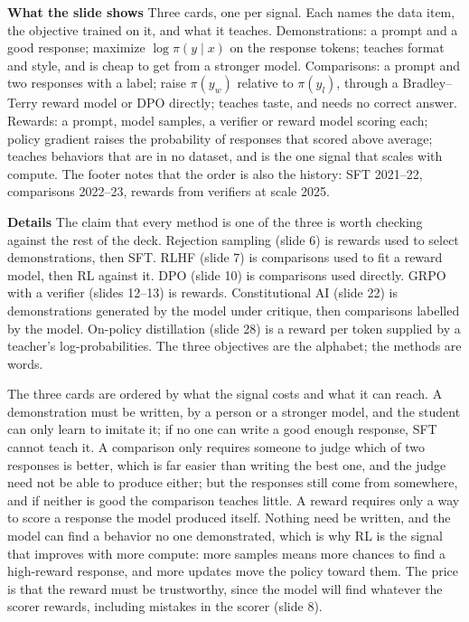 \documentclass[11pt,letterpaper]{article}
\newcommand{\para}[1]{\medskip\noindent\textbf{#1}\quad}
\begin{document}
\para{What the slide shows} Three cards, one per signal. Each names the data item, the objective trained on it, and what it teaches. Demonstrations: a prompt and a good response; maximize $\log\pi(y\mid x)$ on the response tokens; teaches format and style, and is cheap to get from a stronger model. Comparisons: a prompt and two responses with a label; raise $\pi(y_w)$ relative to $\pi(y_l)$, through a Bradley--Terry reward model or DPO directly; teaches taste, and needs no correct answer. Rewards: a prompt, model samples, a verifier or reward model scoring each; policy gradient raises the probability of responses that scored above average; teaches behaviors that are in no dataset, and is the one signal that scales with compute. The footer notes that the order is also the history: SFT 2021--22, comparisons 2022--23, rewards from verifiers at scale 2025.

\para{Details} The claim that every method is one of the three is worth checking against the rest of the deck. Rejection sampling (slide 6) is rewards used to select demonstrations, then SFT. RLHF (slide 7) is comparisons used to fit a reward model, then RL against it. DPO (slide 10) is comparisons used directly. GRPO with a verifier (slides 12--13) is rewards. Constitutional AI (slide 22) is demonstrations generated by the model under critique, then comparisons labelled by the model. On-policy distillation (slide 28) is a reward per token supplied by a teacher's log-probabilities. The three objectives are the alphabet; the methods are words.

The three cards are ordered by what the signal costs and what it can reach. A demonstration must be written, by a person or a stronger model, and the student can only learn to imitate it; if no one can write a good enough response, SFT cannot teach it. A comparison only requires someone to judge which of two responses is better, which is far easier than writing the best one, and the judge need not be able to produce either; but the responses still come from somewhere, and if neither is good the comparison teaches little. A reward requires only a way to score a response the model produced itself. Nothing need be written, and the model can find a behavior no one demonstrated, which is why RL is the signal that improves with more compute: more samples means more chances to find a high-reward response, and more updates move the policy toward them. The price is that the reward must be trustworthy, since the model will find whatever the scorer rewards, including mistakes in the scorer (slide 8).
\end{document}
